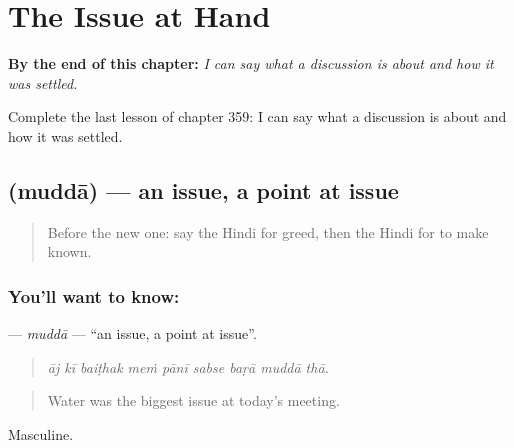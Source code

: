 
\chapter{The Issue at Hand}
\label{ch:hi-the-issue-at-hand}

\begin{chapteropening}
\textbf{By the end of this chapter:} \emph{I can say what a discussion is about and how it was settled.}

Complete the last lesson of chapter 359: I can say what a discussion is about and how it was settled.
\end{chapteropening}

\section[\texorpdfstring{\hi{मुद्दा} (muddā)}{मुद्दा (muddā)}]{ (muddā) — an issue, a point at issue}

\label{lesson:HI-C359-mudda}



\begin{quote}
Before the new one: say the Hindi for greed, then the Hindi for to make known.
\end{quote}

\subsection*{You'll want to know: }
\textbf{} — \emph{muddā} — \textquotedblleft{}an issue, a point at issue\textquotedblright{}.

\begin{quote}
        
\end{quote}

\begin{quote}
\emph{āj kī baiṭhak meṁ pānī sabse baṛā muddā thā.}
\end{quote}

\begin{quote}
Water was the biggest issue at today's meeting.
\end{quote}

Masculine.

